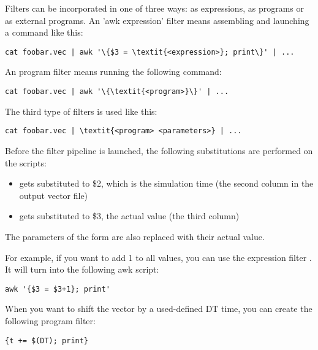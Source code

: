 Filters can be incorporated in one of three ways: as 
expressions, as  programs or as external programs. An 'awk
expression' filter means assembling and launching a command like this:

\begin{Verbatim}[commandchars=\\\{\}]
cat foobar.vec | awk '\{$3 = \textit{<expression>}; print\}' | ...
\end{Verbatim}

An  program filter means running the following command:

\begin{Verbatim}[commandchars=\\\{\}]
cat foobar.vec | awk '\{\textit{<program>}\}' | ...
\end{Verbatim}

The third type of filters is used like this:

\begin{Verbatim}[commandchars=\\\{\}]
cat foobar.vec | \textit{<program> <parameters>} | ...
\end{Verbatim}

Before the filter pipeline is launched, the following substitutions
are performed on the  scripts:

\begin{itemize}
  \item {} gets substituted to \$2, which is the simulation time
  (the second column in the output vector file)
  \item {} gets substituted to \$3, the actual value (the third column)
\end{itemize}

The parameters of the form  are also replaced with
their actual value.

For example, if you want to add 1 to all values, you can use the 
expression filter . It will turn into the following awk script:

\begin{verbatim}
awk '{$3 = $3+1}; print'
\end{verbatim}


When you want to shift the vector by a used-defined DT time,
you can create the following  program filter:

\begin{verbatim}
{t += $(DT); print}
\end{verbatim}

